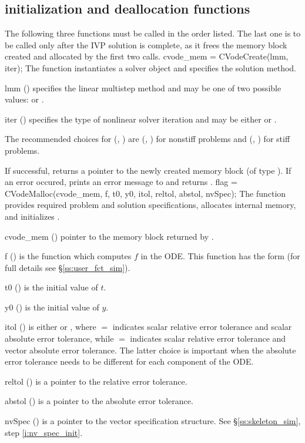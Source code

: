 \subsection{{\cvodes} initialization and deallocation functions}
\label{sss:cvodemalloc}
The following three functions must be called in the order listed. The last one is to be 
called only after the IVP solution is complete, as it frees the {\cvodes} memory block
created and allocated by the first two calls.
{
  cvode\_mem = CVodeCreate(lmm, iter);
}
{
  The function  instantiates a {\cvodes} solver object and specifies 
  the solution method.
}
{
  \begin{args}[iter]
  \item[lmm] ()
    specifies the linear multistep method and may be one of two
    possible values:  or .     
  \item[iter] ()
    specifies the type of nonlinear solver iteration and may be
    either  or . 
  \end{args}
  The recommended choices for (, ) are
  (, ) for nonstiff problems and
  (, ) for stiff problems.
}
{
  If successful,  returns a pointer to the newly created 
  {\cvodes} memory block (of type ).
  If an error occured,  prints an error message to 
  and returns .
}
{}
{
flag = CVodeMalloc(cvode\_mem, f, t0, y0, itol, reltol, abstol, nvSpec);
}
{
  The function  provides required problem and solution specifications, 
  allocates internal memory, and initializes {\cvodes}.
}
{
  \begin{args}[abstol]
  \item[cvode\_mem] ()
    pointer to the {\cvodes} memory block returned by .
  \item[f] ()
    is the {\C} function which computes $f$ in the ODE. This function has the form 
     (for full details see \S\ref{ss:user_fct_sim}).
  \item[t0] ()
    is the initial value of $t$.
  \item[y0] ()
    is the initial value of $y$. 
  \item[itol] () 
    is either  or , where $=$ indicates scalar relative error 
    tolerance and scalar absolute error tolerance, while $=$ indicates scalar
    relative error tolerance and vector absolute error tolerance. 
    The latter choice is important when the absolute error tolerance needs to
    be different for each component of the ODE. 
  \item[reltol] ()
    is a pointer to the relative error tolerance.
  \item[abstol] ()
    is a pointer to the absolute error tolerance.
  \item[nvSpec] ()
    is a pointer to the vector specification structure. See \S\ref{ss:skeleton_sim}, 
    step \ref{i:nv_spec_init}.
  \end{args}
}
